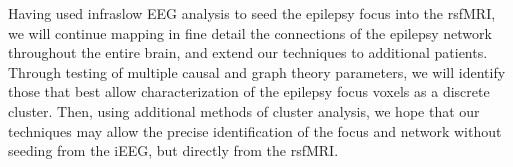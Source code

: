 


Having used infraslow EEG analysis to seed the epilepsy focus into the rsfMRI, we will continue mapping in fine detail the connections of the epilepsy network throughout the entire brain, and extend our techniques to additional patients. Through testing of multiple causal and graph theory parameters, we will identify those that best allow characterization of the epilepsy focus voxels as a discrete cluster. Then, using additional methods of cluster analysis, we hope that our techniques may allow the precise identification of the focus and network without seeding from the iEEG, but directly from the rsfMRI.